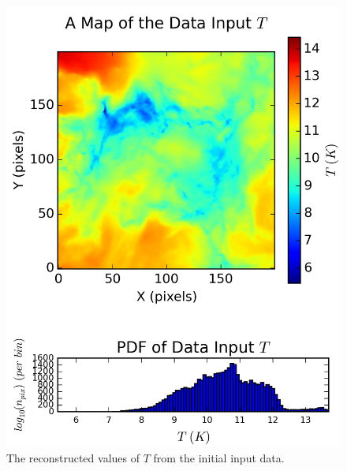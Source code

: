 \documentclass{report}
\begin{document}
\begin{figure}[H]
{\begin{minipage}[b]{0.34\linewidth}
    \includegraphics[width=\linewidth]{../img/sph/map_T_data.png}
    \caption{\protect The reconstructed values of $T$ from the initial input data.}\label{fig:map_T_data_sph}
    \vspace{4ex}
  \end{minipage}}
\end{figure}
\end{document}
